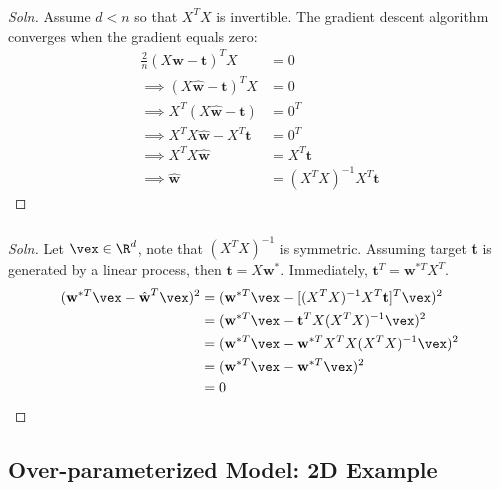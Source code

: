 \documentclass{article}
\begin{document}
	\subsubsection{}
	\begin{proof}[Soln]
		Assume $d < n$ so that $X^T X$ is invertible. The gradient descent algorithm converges when the gradient equals zero:
		\begin{align}
			\frac{2}{n} (X \hat{\textbf{w}} - \textbf{t})^T X &= 0 \\
			\implies (X \hat{\textbf{w}} - \textbf{t})^T X &= 0 \\
			\implies X^T (X \hat{\textbf{w}} - \textbf{t}) &= 0^T \\
			\implies X^T X \hat{\textbf{w}} - X^T \textbf{t} &= 0^T \\
			\implies X^T X \hat{\textbf{w}} &= X^T \textbf{t} \\
			\implies \hat{\textbf{w}} &= (X^T X)^{-1} X^T \textbf{t}
		\end{align}
	\end{proof}
	\subsubsection{}
	\begin{proof}[Soln]
		Let $\vex \in \R^d$, note that $(X^T X)^{-1}$ is symmetric. Assuming target \textbf{t} is generated by a linear process, then $\textbf{t} = X \textbf{w}^*$. Immediately, $\textbf{t}^T = \textbf{w}^{*T} X^T$.
		\begin{align}
			(\textbf{w}^{*T} \vex  -  \hat{\textbf{w}}^{T} \vex)^2 
			&= (\textbf{w}^{*T} \vex - [(X^T X)^{-1} X^T \textbf{t}]^T \vex)^2 \\
			&= (\textbf{w}^{*T} \vex - \textbf{t}^T X (X^T X)^{-1} \vex)^2 \\
			&= (\textbf{w}^{*T} \vex - \textbf{w}^{*T} X^T X (X^T X)^{-1} \vex)^2 \\
			&= (\textbf{w}^{*T} \vex - \textbf{w}^{*T} \vex)^2 \\
			&= 0
		\end{align}
	\end{proof}
	
	\subsection{Over-parameterized Model: 2D Example}
\end{document}
